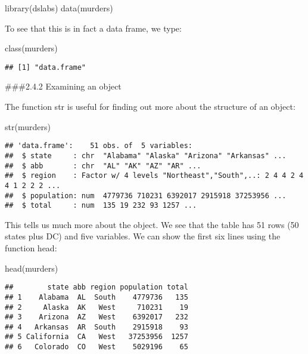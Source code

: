 \documentclass[
]{article}
\newenvironment{Shaded}{\begin{snugshade}}{\end{snugshade}}
\newcommand{\FunctionTok}[1]{\textcolor[rgb]{0.00,0.00,0.00}{#1}}
\newcommand{\NormalTok}[1]{#1}
\begin{document}
\begin{Shaded}
\begin{Highlighting}[]
\FunctionTok{library}\NormalTok{(dslabs)}
\FunctionTok{data}\NormalTok{(murders)}
\end{Highlighting}
\end{Shaded}

To see that this is in fact a data frame, we type:

\begin{Shaded}
\begin{Highlighting}[]
\FunctionTok{class}\NormalTok{(murders)}
\end{Highlighting}
\end{Shaded}

\begin{verbatim}
## [1] "data.frame"
\end{verbatim}

\#\#\#2.4.2 Examining an object

The function str is useful for finding out more about the structure of
an object:

\begin{Shaded}
\begin{Highlighting}[]
\FunctionTok{str}\NormalTok{(murders)}
\end{Highlighting}
\end{Shaded}

\begin{verbatim}
## 'data.frame':    51 obs. of  5 variables:
##  $ state     : chr  "Alabama" "Alaska" "Arizona" "Arkansas" ...
##  $ abb       : chr  "AL" "AK" "AZ" "AR" ...
##  $ region    : Factor w/ 4 levels "Northeast","South",..: 2 4 4 2 4 4 1 2 2 2 ...
##  $ population: num  4779736 710231 6392017 2915918 37253956 ...
##  $ total     : num  135 19 232 93 1257 ...
\end{verbatim}

This tells us much more about the object. We see that the table has 51
rows (50 states plus DC) and five variables. We can show the first six
lines using the function head:

\begin{Shaded}
\begin{Highlighting}[]
\FunctionTok{head}\NormalTok{(murders)}
\end{Highlighting}
\end{Shaded}

\begin{verbatim}
##        state abb region population total
## 1    Alabama  AL  South    4779736   135
## 2     Alaska  AK   West     710231    19
## 3    Arizona  AZ   West    6392017   232
## 4   Arkansas  AR  South    2915918    93
## 5 California  CA   West   37253956  1257
## 6   Colorado  CO   West    5029196    65
\end{verbatim}
\end{document}
